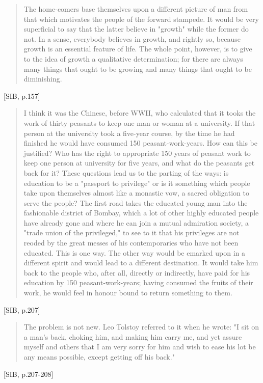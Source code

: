\begin{quote}
  The home-comers base themselves upon a different picture of man from that which motivates the people of the forward stampede. It would be very superficial to say that the latter believe in "growth" while the former do not. In a sense, everybody believes in growth, and rightly so, because growth is an essential feature of life. The whole point, however, is to give to the idea of growth a qualitative determination; for there are always many things that ought to be growing and many things that ought to be diminishing.
\end{quote}[SIB, p.157]

\begin{quote}
  I think it was the Chinese, before WWII, who calculated that it tooks the work of thirty peasants to keep one man or woman at a university. If that person at the university took a five-year course, by the time he had finished he would have consumed 150 peasant-work-years. How can this be justified? Who has the right to appropriate 150 years of peasant work to keep one person at university for five years, and what do the peasants get back for it? These questions lead us to the parting of the ways: is education to be a "passport to privilege" or is it something which people take upon themselves almost like a monastic vow, a sacred obligation to serve the people? The first road takes the educated young man into the fashionable district of Bombay, which a lot of other highly educated people have already gone and where he can join a mutual admiration society, a "trade union of the privileged," to see to it that his privileges are not reoded by the great messes of his contemporaries who have not been educated. This is one way. The other way would be emarked upon in a different spirit and would lead to a different destination. It would take him back to the people who, after all, directly or indirectly, have paid for his education by 150 peasant-work-years; having consumed the fruits of their work, he would feel in honour bound to return something to them.
\end{quote}[SIB, p.207]

\begin{quote}
  The problem is not new. Leo Tolstoy referred to it when he wrote: "I sit on a man's back, choking him, and making him carry me, and yet assure myself and others that I am very sorry for him and wish to ease his lot be any means possible, except getting off his back."
\end{quote}[SIB, p.207-208]

